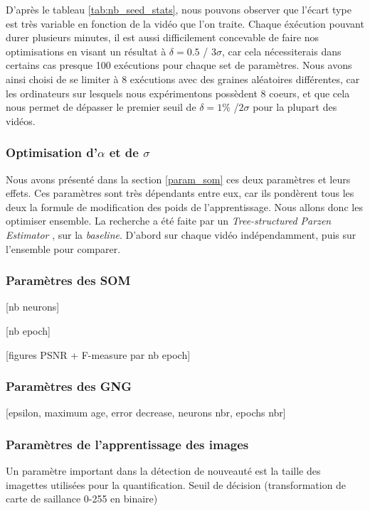 	D'après le tableau \ref{tab:nb_seed_stats}, nous pouvons observer que l'écart type est très variable en fonction de la vidéo que l'on traite. Chaque éxécution pouvant durer plusieurs minutes, il est aussi difficilement concevable de faire nos optimisations en visant un résultat à $\delta = 0.5$ / $3\sigma$, car cela nécessiterais dans certains cas presque 100 exécutions pour chaque set de paramètres. Nous avons ainsi choisi de se limiter à 8 exécutions avec des graines aléatoires différentes, car les ordinateurs sur lesquels nous expérimentons possèdent 8 coeurs, et que cela nous permet de dépasser le premier seuil de $\delta=1\%$ /$2\sigma$ pour la plupart des vidéos.

	\subsubsection{Optimisation d'$\alpha$ et de $\sigma$}

	Nous avons présenté dans la section \ref{param_som} ces deux paramètres et leurs effets. Ces paramètres sont très dépendants entre eux, car ils pondèrent tous les deux la formule de modification des poids de l'apprentissage. Nous allons donc les optimiser ensemble. La recherche a été faite par un \textit{Tree-structured Parzen Estimator} \cite{bergstra2011algorithms}, sur la \textit{baseline}. D'abord sur chaque vidéo indépendamment, puis sur l'ensemble pour comparer.

	\subsubsection{Paramètres des SOM}

	[nb neurons]

	[nb epoch]

	[figures PSNR + F-measure par nb epoch]

	\subsubsection{Paramètres des GNG}

	[epsilon, maximum age, error decrease, neurons nbr, epochs nbr]

	\subsubsection{Paramètres de l'apprentissage des images}

	Un paramètre important dans la détection de nouveauté est la taille des imagettes utilisées pour la quantification. 
	Seuil de décision (transformation de carte de saillance 0-255 en binaire)

